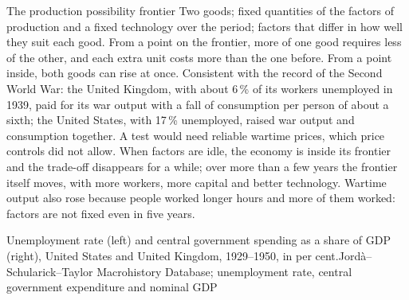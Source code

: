 \begin{model}{The production possibility frontier}
\assumes Two goods; fixed quantities of the factors of production and a fixed technology over the
  period; factors that differ in how well they suit each good.
\predicts From a point on the frontier, more of one good requires less of the other, and each extra
  unit costs more than the one before. From a point inside, both goods can rise at once.
\tested Consistent with the record of the Second World War: the United Kingdom, with about 6\,\% of its
  workers unemployed in 1939, paid for its war output with a fall of consumption per person of about a
  sixth; the United States, with 17\,\% unemployed, raised war output and consumption together. A test
  would need reliable wartime prices, which price controls did not allow.
\breaks When factors are idle, the economy is inside its frontier and the trade-off disappears for a
  while; over more than a few years the frontier itself moves, with more workers, more capital and
  better technology. Wartime output also rose because people worked longer hours and more of them
  worked: factors are not fixed even in five years.
\end{model}

\begin{omchart}{Unemployment rate (left) and central government spending as a share of GDP (right),
United States and United Kingdom, 1929--1950, in per cent.}{Jord\`a--Schularick--Taylor Macrohistory
Database; unemployment rate, central government expenditure and nominal GDP}
\end{omchart}

